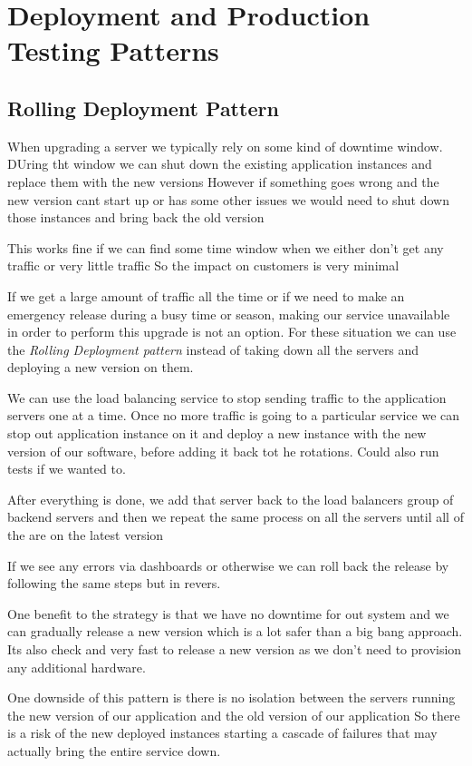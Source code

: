 \documentclass[a4paper, 11pt]{book}
\begin{document}
    \section{Deployment and Production Testing Patterns}

    \subsection{Rolling Deployment Pattern}
    When upgrading a server we typically rely on some kind of downtime window.
    DUring tht window we can shut down the existing application instances and replace them with the new versions
    However if something goes wrong and the new version cant start up or has some other issues we would need to shut down those instances and bring back the old version

    This works fine if we can find some time window when we either don't get any traffic or very little traffic
    So the impact on customers is very minimal

    If we get a large amount of traffic all the time or if we need to make an emergency release during a busy time or season, making our service unavailable in order to perform this upgrade is not an option.
    For these situation we can use the \textit{Rolling Deployment pattern} instead of taking down all the servers and deploying a new version on them.

    We can use the load balancing service to stop sending traffic to the application servers one at a time.
    Once no more traffic is going to a particular service we can stop out application instance on it and deploy a new instance with the new version of our software, before adding it back tot he rotations.
    Could also run tests if we wanted to.

    After everything is done, we add that server back to the load balancers group of backend servers and then we repeat the same process on all the servers until all of the are on the latest version

    If we see any errors via dashboards or otherwise we can roll back the release by following the same steps but in revers.

    One benefit to the strategy is that we have no downtime for out system and we can gradually release a new version which is a lot safer than a big bang approach.
    Its also check and very fast to release a new version as we don't need to provision any additional hardware.

    One downside of this pattern is there is no isolation between the servers running the new version of our application and the old version of our application
    So there is a risk of the new deployed instances starting a cascade of failures that may actually bring the entire service down.
\end{document}
